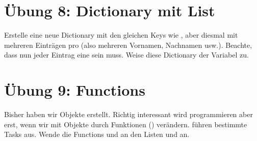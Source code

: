\documentclass[letterpaper,10pt,english]{sphinxmanual}
\begin{document}
\begin{sphinxVerbatim}
\end{sphinxVerbatim}


\section{Übung 8: Dictionary mit List}
\label{\detokenize{01_02_Python_Basics:ubung-8-dictionary-mit-list}}
Erstelle eine neue Dictionary mit den gleichen Keys wie , aber diesmal mit mehreren Einträgen pro  (also mehreren Vornamen, Nachnamen usw.). Beachte, dass nun jeder Eintrag eine  sein muss. Weise diese Dictionary der Variabel  zu.

\begin{sphinxVerbatim}[commandchars=\\\{\}]
   \PYG{p}{[}  \PYG{p}{]}  \PYG{p}{[} \PYG{p}{]}  \PYG{p}{[}  \PYG{p}{]}
\end{sphinxVerbatim}


\section{Übung 9: Functions}
\label{\detokenize{01_02_Python_Basics:ubung-9-functions}}
Bisher haben wir Objekte erstellt. Richtig interessant wird programmieren aber erst, wenn wir mit Objekte durch Funktionen () verändern.  führen bestimmte Tasks aus. Wende die Functions  und  an den Listen  und  an.
\end{document}
